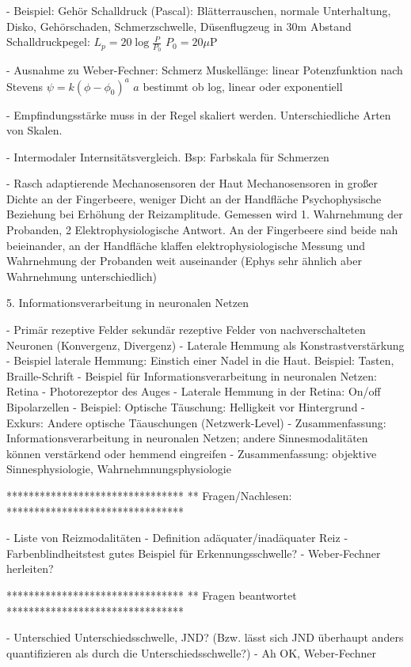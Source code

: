 - Beispiel: Gehör
    Schalldruck (Pascal): Blätterrauschen, normale Unterhaltung, Disko, Gehörschaden, Schmerzschwelle, Düsenflugzeug in 30m Abstand
    Schalldruckpegel: \(L_p = 20 \log \frac{P}{P_0}\)
    \(P_0=20 \mu\text{P}\)

- Ausnahme zu Weber-Fechner: Schmerz
    Muskellänge: linear
    Potenzfunktion nach Stevens 
    \( \psi = k(\phi-\phi_0)^a\)
    \(a\) bestimmt ob log, linear oder exponentiell
    
- Empfindungsstärke muss in der Regel skaliert werden. Unterschiedliche Arten von Skalen. 

- Intermodaler Internsitätsvergleich. Bsp: Farbskala für Schmerzen

- Rasch adaptierende Mechanosensoren der Haut
    Mechanosensoren in großer Dichte an der Fingerbeere, weniger Dicht an der Handfläche
    Psychophysische Beziehung bei Erhöhung der Reizamplitude. Gemessen wird 1. Wahrnehmung der Probanden, 2 Elektrophysiologische Antwort.
    An der Fingerbeere sind beide nah beieinander, an der Handfläche klaffen elektrophysiologische Messung und Wahrnehmung der Probanden weit auseinander (Ephys sehr ähnlich aber Wahrnehmung unterschiedlich)

5. Informationsverarbeitung in neuronalen Netzen

- Primär rezeptive Felder
    sekundär rezeptive Felder von nachverschalteten Neuronen (Konvergenz, Divergenz)
- Laterale Hemmung als Konstrastverstärkung
- Beispiel laterale Hemmung: Einstich einer Nadel in die Haut. Beispiel: Tasten, Braille-Schrift
- Beispiel für Informationsverarbeitung in neuronalen Netzen: Retina
- Photorezeptor des Auges
- Laterale Hemmung in der Retina: On/off Bipolarzellen
- Beispiel: Optische Täuschung: Helligkeit vor Hintergrund 
- Exkurs: Andere optische Täauschungen (Netzwerk-Level)
- Zusammenfassung: Informationsverarbeitung in neuronalen Netzen; andere Sinnesmodalitäten können verstärkend oder hemmend eingreifen
- Zusammenfassung: objektive Sinnesphysiologie, Wahrnehmnungsphysiologie


********************************
** Fragen/Nachlesen:
********************************

- Liste von Reizmodalitäten
- Definition adäquater/inadäquater Reiz
- Farbenblindheitstest gutes Beispiel für Erkennungsschwelle?
- Weber-Fechner herleiten?


********************************
** Fragen beantwortet
********************************

- Unterschied Unterschiedsschwelle, JND? (Bzw. lässt sich JND überhaupt anders quantifizieren als durch die Unterschiedsschwelle?) - Ah OK, Weber-Fechner 


